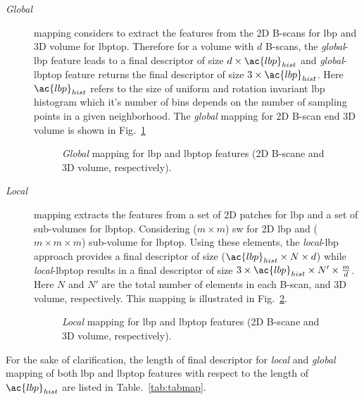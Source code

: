 \begin{description}
\item[\emph{Global}] mapping considers to extract the features from the 2D B-scans for \ac{lbp} and 3D volume for \ac{lbptop}.
Therefore for a volume with $d$ B-scans, the \emph{global}-\ac{lbp} feature leads to a final descriptor of size $d \times \ac{lbp}_{hist}$ and \emph{global}-\ac{lbptop} feature returns the final descriptor of size $3 \times \ac{lbp}_{hist}$.
Here $\ac{lbp}_{hist}$ refers to the size of uniform and rotation invariant \ac{lbp} histogram which it's number of bins depends on the number of sampling points in a given neighborhood.
The \emph{global} mapping for 2D B-scan end 3D volume is shown in Fig.~\ref{fig:globalmapping}
\begin{figure}[h]
\begin{center}
\hfill
{}
\caption{\emph{Global} mapping for \ac{lbp} and \ac{lbptop} features (2D B-scane and 3D volume, respectively).}
\end{center}
\label{fig:globalmapping}
\end{figure}
\item[\emph{Local}] mapping extracts the features from a set of 2D patches for \ac{lbp} and a set of sub-volumes for \ac{lbptop}.
Considering ($m \times m$) \acf{sw} for 2D \ac{lbp} and ($ m \times m \times m$) sub-volume for \ac{lbptop}.
Using these elements, the \emph{local}-\ac{lbp} approach provides a final descriptor of size ($\ac{lbp}_{hist} \times N \times d $) while \emph{local}-\ac{lbptop} results in a final descriptor of size $3 \times \ac{lbp}_{hist} \times N' \times \frac{m}{d}$.
Here $N$ and $N'$ are the total number of elements in each B-scan, and 3D volume, respectively.
This mapping is illustrated in Fig.~\ref{fig:localmapping}.
\begin{figure}[h]
\begin{center}
\hfill
{}
\caption{\emph{Local} mapping for \ac{lbp} and \ac{lbptop} features (2D B-scane and 3D volume, respectively).}
\end{center}
\label{fig:localmapping}
\end{figure}

\end{description}

For the sake of clarification, the length of final descriptor for \emph{local} and \emph{global} mapping of both \ac{lbp} and \ac{lbptop} features with respect to the length of $\ac{lbp}_{hist}$ are listed in Table.~\ref{tab:tabmap}.

